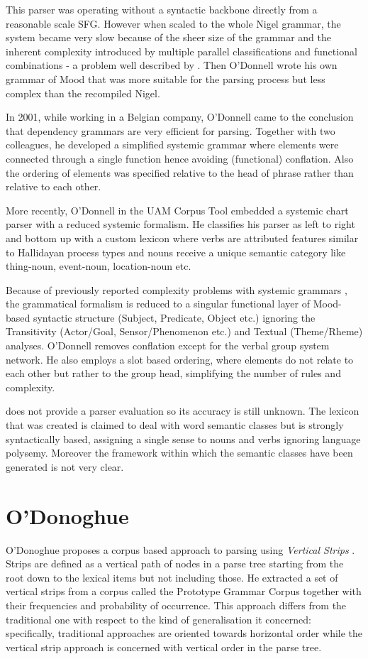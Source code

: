     This parser was operating without a syntactic backbone directly from a reasonable scale SFG. However when scaled to the whole Nigel grammar, the system became very slow because of the sheer size of the grammar and the inherent complexity introduced by multiple parallel classifications and functional combinations - a problem well described by \citet{Bateman2008}. Then O'Donnell wrote his own grammar of Mood that was more suitable for the parsing process but less complex than the recompiled Nigel.
    
    In 2001, while working in a Belgian company, O'Donnell came to the conclusion that dependency grammars are very efficient for parsing. Together with two colleagues, he developed a simplified systemic grammar where elements were connected through a single function hence avoiding (functional) conflation. Also the ordering of elements was specified relative to the head of phrase rather than relative to each other.

    More recently, O'Donnell in the UAM Corpus Tool embedded a systemic chart parser \citep{ODonnell2005a} with a reduced systemic formalism. He classifies his parser as left to right and bottom up with a custom lexicon where verbs are attributed features similar to Hallidayan process types and nouns receive a unique semantic category like thing-noun, event-noun, location-noun etc.

    Because of previously reported complexity problems with systemic grammars \citep{ODonnell1993}, the grammatical formalism is reduced to a singular functional layer of Mood-based syntactic structure (Subject, Predicate, Object etc.) ignoring the Transitivity (Actor/Goal, Sensor/Phenomenon etc.) and  Textual (Theme/Rheme) analyses. %
    O'Donnell removes conflation except for the verbal group system network. He also employs a slot based ordering, where elements do not relate to each other but rather to the group head,  simplifying the number of rules and complexity.   

    \citet{ODonnell2005a} does not provide a parser evaluation so its accuracy is still unknown. The lexicon that was created is claimed to deal with word semantic classes but is strongly syntactically based, assigning a single sense to nouns and verbs ignoring language polysemy. Moreover the framework within which the semantic classes have been generated is not very clear. 

\section{O'Donoghue} 
    O'Donoghue proposes a corpus based approach to parsing using \textit{Vertical Strips} \citep{ODonoghue1991a}. Strips are defined as a vertical path of nodes in a parse tree starting from the root down to the lexical items but not including those. He extracted a set of vertical strips from a corpus called the Prototype Grammar Corpus together with their frequencies and probability of occurrence. This approach differs from the traditional one with respect to the kind of generalisation it concerned: specifically, traditional approaches are oriented towards horizontal order while the vertical strip approach is concerned with vertical order in the parse tree. 
    
